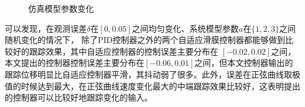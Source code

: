 \begin{figure}[H]
    \centering
    \hspace{0.5pt}
    \centering
    \caption[]{仿真模型参数变化}
    \label{fig:simu_model_params}
\end{figure}

可以发现，在观测误差$\delta$在$[0, 0.05]$之间均匀变化、系统模型参数$a$在$\{1,2,3\}$之间随机变化的情况下，
除了PID控制器之外的两个自适应滑膜控制器都能够做到比较好的跟踪效果，其中自适应控制器的控制误差主要分布在
$\left[ -0.02,0.02 \right] $之间，本文提出的控制器控制误差主要分布在$\left[ -0.06,0.01 \right] $之间，但本文控制器输出的跟踪位移明显比自适应控制器平滑，其抖动弱了很多。此外，误差在正弦曲线取极值的时候达到最大，在正弦曲线速度变化最大的中端跟踪效果比较好，这表明提出的控制器可以比较好地跟踪变化的输入。


